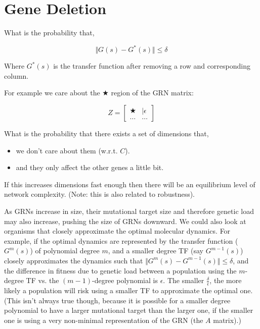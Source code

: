 \documentclass[a4paper, 11 pt]{article}
\begin{document}
  \section{Gene Deletion}
             What is the probability that,
             
             \begin{equation*}
                \Vert G(s) - G^{*}(s) \Vert \leq \delta
              \end{equation*}
              
              Where $G^{*}(s)$ is the transfer function after removing a row and corresponding column.

              For example we care about the $\bigstar$ region of the GRN matrix:

              \begin{equation*}
                Z = \begin{bmatrix} \bigstar &\vert \epsilon \\ \hdots & \hdots \end{bmatrix}
              \end{equation*}

              What is the probability that there exists a set of dimensions that, 
              \begin{itemize}
                \item we don't care about them (w.r.t. $C$). 
                \item and they only affect the other genes a little bit.
              \end{itemize}

              If this increases dimensions fast enough then there will be an equilibrium level of network complexity. (Note: this is also related to robustness).

              As GRNs increase in size, their mutational target size and therefore genetic load may also increase, pushing the size of GRNs downward. We could also look at organisms that closely approximate the optimal molecular dynamics. For example, if the optimal dynamics are represented by the transfer function ($G^{m}(s)$) of polynomial degree $m$, and a smaller degree TF (say $G^{m-1}(s)$) closely approximates the dynamics such that $\Vert G^{m}(s) - G^{m-1}(s) \Vert \leq \delta$, and the difference in fitness due to genetic load between a population using the $m$-degree TF vs. the $(m-1)$-degree polynomial is $\epsilon$. The smaller $\frac{\delta}{\epsilon}$, the more likely a population will risk using a smaller TF to approximate the optimal one. (This isn't always true though, because it is possible for a smaller degree polynomial to have a larger mutational target than the larger one, if the smaller one is using a very non-minimal representation of the GRN (the $A$ matrix).)
\end{document}
